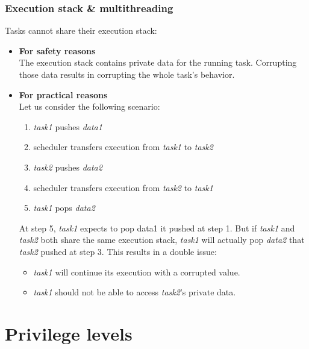 \begin{frame}
  \frametitle{Execution stack \& multithreading}

  Tasks cannot share their execution stack:

  \begin{itemize}
    \item {\bf For safety reasons}\\
      The execution stack contains private data for the running task.
      Corrupting those data results in corrupting the whole task's behavior.

      \nl

    \item {\bf For practical reasons}\\
      Let us consider the following scenario:

      \begin{enumerate}
        \item {\em task1} pushes {\em data1}
	\item scheduler transfers execution from {\em task1} to {\em task2}
	\item {\em task2} pushes {\em data2}
	\item scheduler transfers execution from {\em task2} to {\em task1}
	\item {\em task1} pops {\em data2}
      \end{enumerate}

      \nl

      At step 5, {\em task1} expects to pop data1 it pushed at step 1. But if
      {\em task1} and {\em task2} both share the same execution stack,
      {\em task1} will actually pop {\em data2} that {\em task2} pushed at step
      3. This results in a double issue:

      \begin{itemize}
	\item {\em task1} will continue its execution with a corrupted value.
	\item {\em task1} should not be able to access {\em task2}'s private data.
      \end{itemize}

  \end{itemize}

\end{frame}

\section{Privilege levels}

